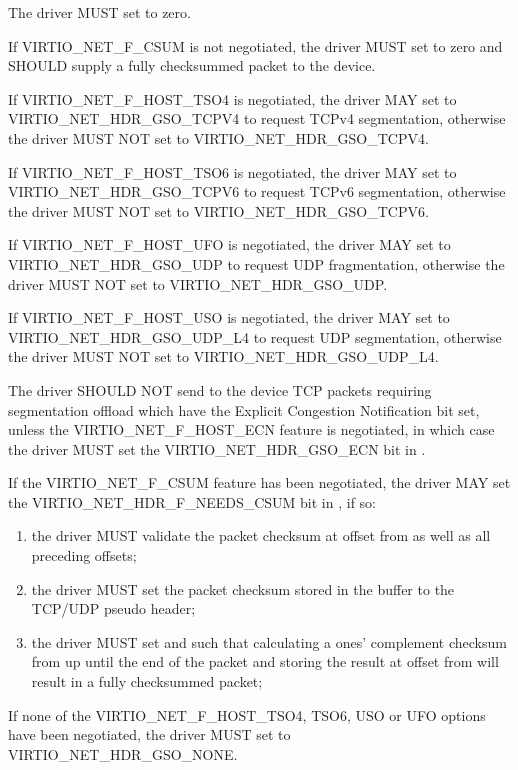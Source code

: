 The driver MUST set  to zero.

If VIRTIO_NET_F_CSUM is not negotiated, the driver MUST set
 to zero and SHOULD supply a fully checksummed
packet to the device.

If VIRTIO_NET_F_HOST_TSO4 is negotiated, the driver MAY set
 to VIRTIO_NET_HDR_GSO_TCPV4 to request TCPv4
segmentation, otherwise the driver MUST NOT set
 to VIRTIO_NET_HDR_GSO_TCPV4.

If VIRTIO_NET_F_HOST_TSO6 is negotiated, the driver MAY set
 to VIRTIO_NET_HDR_GSO_TCPV6 to request TCPv6
segmentation, otherwise the driver MUST NOT set
 to VIRTIO_NET_HDR_GSO_TCPV6.

If VIRTIO_NET_F_HOST_UFO is negotiated, the driver MAY set
 to VIRTIO_NET_HDR_GSO_UDP to request UDP
fragmentation, otherwise the driver MUST NOT set
 to VIRTIO_NET_HDR_GSO_UDP.

If VIRTIO_NET_F_HOST_USO is negotiated, the driver MAY set
 to VIRTIO_NET_HDR_GSO_UDP_L4 to request UDP
segmentation, otherwise the driver MUST NOT set
 to VIRTIO_NET_HDR_GSO_UDP_L4.

The driver SHOULD NOT send to the device TCP packets requiring segmentation offload
which have the Explicit Congestion Notification bit set, unless the
VIRTIO_NET_F_HOST_ECN feature is negotiated, in which case the
driver MUST set the VIRTIO_NET_HDR_GSO_ECN bit in
.

If the VIRTIO_NET_F_CSUM feature has been negotiated, the
driver MAY set the VIRTIO_NET_HDR_F_NEEDS_CSUM bit in
, if so:
\begin{enumerate}
\item the driver MUST validate the packet checksum at
	offset  from  as well as all
	preceding offsets;
\item the driver MUST set the packet checksum stored in the
	buffer to the TCP/UDP pseudo header;
\item the driver MUST set  and
	 such that calculating a ones'
	complement checksum from  up until the end of
	the packet and storing the result at offset 
	from   will result in a fully checksummed
	packet;
\end{enumerate}

If none of the VIRTIO_NET_F_HOST_TSO4, TSO6, USO or UFO options have
been negotiated, the driver MUST set  to
VIRTIO_NET_HDR_GSO_NONE.

